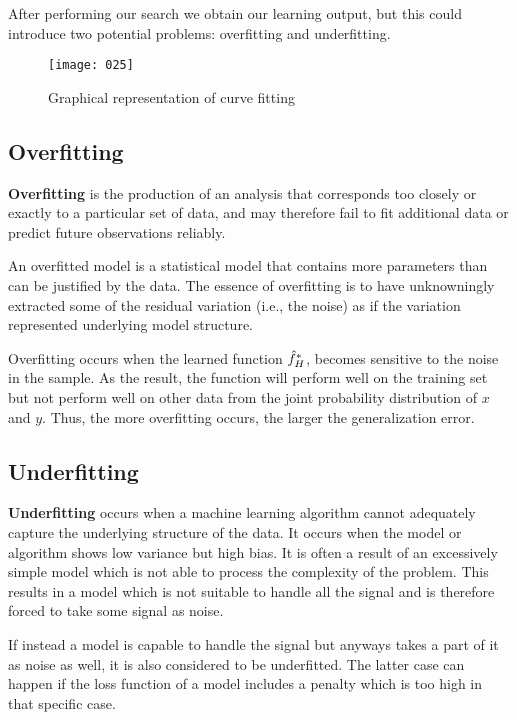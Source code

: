 After performing our search we obtain our learning output, but this could introduce two potential problems: overfitting and underfitting.
\begin{figure}[h]
\begin{center}
    \texttt{[image: 025]}
    \caption{Graphical representation of curve fitting}
\end{center}
\end{figure}

\subsection{Overfitting}
\textbf{Overfitting} is the production of an analysis that corresponds too closely or exactly to a particular set of data, and may therefore fail to fit additional data or predict future observations reliably.

An overfitted model is a statistical model that contains more parameters than can be justified by the data. The essence of overfitting is to have unknowningly extracted some of the residual variation (i.e., the noise) as if the variation represented underlying model structure.

Overfitting occurs when the learned function \(\Hat{f}_H^*\), becomes sensitive to the noise in the sample. As the result, the function will perform well on the training set but not perform well on other data from the joint probability distribution of \(x\) and \(y\). Thus, the more overfitting occurs, the larger the generalization error.

\subsection{Underfitting}
\textbf{Underfitting} occurs when a machine learning algorithm cannot adequately capture the underlying structure of the data. It occurs when the model or algorithm shows low variance but high bias. It is often a result of an excessively simple model which is not able to process the complexity of the problem. This results in a model which is not suitable to handle all the signal and is therefore forced to take some signal as noise. 

If instead a model is capable to handle the signal but anyways takes a part of it as noise as well, it is also considered to be underfitted. The latter case can happen if the loss function of a model includes a penalty which is too high in that specific case.

